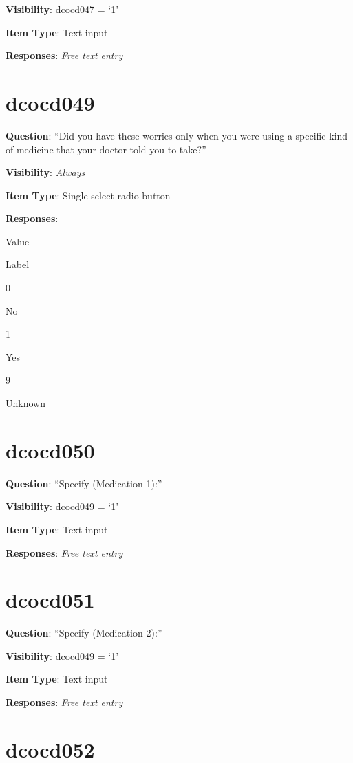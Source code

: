 \documentclass[]{book}
\begin{document}
\textbf{Visibility}: \protect\hyperlink{dcocd047}{dcocd047} = `1'

\textbf{Item Type}: Text input

\textbf{Responses}: \emph{Free text entry}

\hypertarget{dcocd049}{%
\section{dcocd049}\label{dcocd049}}

\textbf{Question}: ``Did you have these worries only when you were using a specific kind of medicine that your doctor told you to take?''

\textbf{Visibility}: \emph{Always}

\textbf{Item Type}: Single-select radio button

\textbf{Responses}:

Value

Label

0

No

1

Yes

9

Unknown

\hypertarget{dcocd050}{%
\section{dcocd050}\label{dcocd050}}

\textbf{Question}: ``Specify (Medication 1):''

\textbf{Visibility}: \protect\hyperlink{dcocd049}{dcocd049} = `1'

\textbf{Item Type}: Text input

\textbf{Responses}: \emph{Free text entry}

\hypertarget{dcocd051}{%
\section{dcocd051}\label{dcocd051}}

\textbf{Question}: ``Specify (Medication 2):''

\textbf{Visibility}: \protect\hyperlink{dcocd049}{dcocd049} = `1'

\textbf{Item Type}: Text input

\textbf{Responses}: \emph{Free text entry}

\hypertarget{dcocd052}{%
\section{dcocd052}\label{dcocd052}}
\end{document}
